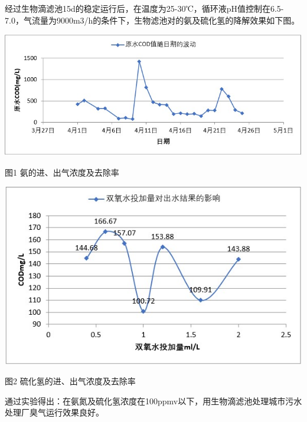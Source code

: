 经过生物滴滤池15d的稳定运行后，在温度为25-30℃，循环液pH值控制在6.5-7.0，气流量为9000m3/h的条件下，生物滤池对的氨及硫化氢的降解效果如下图。\par
{\noindent  \centering  \includegraphics[width=150mm]{Img/fig1.jpg}\par}
{\hspace{40mm} 
图1 氨的进、出气浓度及去除率}
\vspace{10mm}
\par
{\noindent    \includegraphics[width=150mm]{Img/fig2.jpg}\par}
{\hspace{40mm} 图2 硫化氢的进、出气浓度及去除率}\par
\vspace{10mm}
通过实验得出：在氨氮及硫化氢浓度在100ppmv以下，用生物滴滤池处理城市污水处理厂臭气运行效果良好。\par
